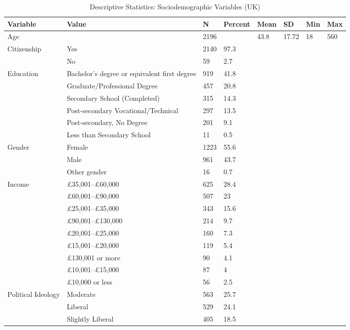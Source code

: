 \begin{table}[H]
\scriptsize
\centering
\caption{Descriptive Statistics: Sociodemographic Variables (UK)}
\label{tab:desc_stats_uk}
\begin{tabular}{llllllll}
\hline
Variable & Value & N & Percent & Mean & SD & Min & Max \\
\hline
Age &  & 2196 &  & 43.8 & 17.72 & 18 & 560 \\
Citizenship & Yes & 2140 & 97.3 &  &  &  &  \\
  & No & 59 & 2.7 &  &  &  &  \\
Education & Bachelor’s degree or equivalent first degree & 919 & 41.8 &  &  &  &  \\
  & Graduate/Professional Degree & 457 & 20.8 &  &  &  &  \\
  & Secondary School (Completed) & 315 & 14.3 &  &  &  &  \\
  & Post-secondary Vocational/Technical & 297 & 13.5 &  &  &  &  \\
  & Post-secondary, No Degree & 201 & 9.1 &  &  &  &  \\
  & Less than Secondary School & 11 & 0.5 &  &  &  &  \\
Gender & Female & 1223 & 55.6 &  &  &  &  \\
  & Male & 961 & 43.7 &  &  &  &  \\
  & Other gender & 16 & 0.7 &  &  &  &  \\
Income & \pounds{}35,001--\pounds{}60,000 & 625 & 28.4 &  &  &  &  \\
  & \pounds{}60,001--\pounds{}90,000 & 507 & 23 &  &  &  &  \\
  & \pounds{}25,001--\pounds{}35,000 & 343 & 15.6 &  &  &  &  \\
  & \pounds{}90,001--\pounds{}130,000 & 214 & 9.7 &  &  &  &  \\
  & \pounds{}20,001--\pounds{}25,000 & 160 & 7.3 &  &  &  &  \\
  & \pounds{}15,001--\pounds{}20,000 & 119 & 5.4 &  &  &  &  \\
  & \pounds{}130,001 or more & 90 & 4.1 &  &  &  &  \\
  & \pounds{}10,001--\pounds{}15,000 & 87 & 4 &  &  &  &  \\
  & \pounds{}10,000 or less & 56 & 2.5 &  &  &  &  \\
Political Ideology & Moderate & 563 & 25.7 &  &  &  &  \\
  & Liberal & 529 & 24.1 &  &  &  &  \\
  & Slightly Liberal & 405 & 18.5 &  &  &  &  \\

\end{tabular}
\end{table}
